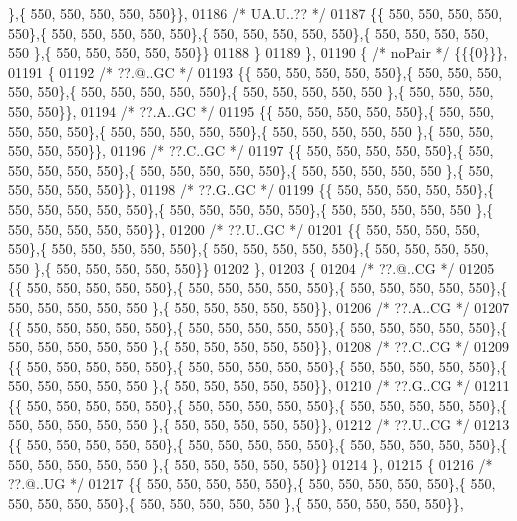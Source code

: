 \begin{DoxyCode}
      \},\{ 550, 550, 550, 550, 550\}\},
01186 \textcolor{comment}{/* UA.U..?? */}
01187 \{\{ 550, 550, 550, 550, 550\},\{ 550, 550, 550, 550, 550\},\{ 550, 550, 550, 550, 550\},\{ 550, 550, 550, 550, 550
      \},\{ 550, 550, 550, 550, 550\}\}
01188 \}
01189 \},
01190 \{ \textcolor{comment}{/* noPair */} \{\{\{0\}\}\},
01191 \{
01192 \textcolor{comment}{/* ??.@..GC */}
01193 \{\{ 550, 550, 550, 550, 550\},\{ 550, 550, 550, 550, 550\},\{ 550, 550, 550, 550, 550\},\{ 550, 550, 550, 550, 550
      \},\{ 550, 550, 550, 550, 550\}\},
01194 \textcolor{comment}{/* ??.A..GC */}
01195 \{\{ 550, 550, 550, 550, 550\},\{ 550, 550, 550, 550, 550\},\{ 550, 550, 550, 550, 550\},\{ 550, 550, 550, 550, 550
      \},\{ 550, 550, 550, 550, 550\}\},
01196 \textcolor{comment}{/* ??.C..GC */}
01197 \{\{ 550, 550, 550, 550, 550\},\{ 550, 550, 550, 550, 550\},\{ 550, 550, 550, 550, 550\},\{ 550, 550, 550, 550, 550
      \},\{ 550, 550, 550, 550, 550\}\},
01198 \textcolor{comment}{/* ??.G..GC */}
01199 \{\{ 550, 550, 550, 550, 550\},\{ 550, 550, 550, 550, 550\},\{ 550, 550, 550, 550, 550\},\{ 550, 550, 550, 550, 550
      \},\{ 550, 550, 550, 550, 550\}\},
01200 \textcolor{comment}{/* ??.U..GC */}
01201 \{\{ 550, 550, 550, 550, 550\},\{ 550, 550, 550, 550, 550\},\{ 550, 550, 550, 550, 550\},\{ 550, 550, 550, 550, 550
      \},\{ 550, 550, 550, 550, 550\}\}
01202 \},
01203 \{
01204 \textcolor{comment}{/* ??.@..CG */}
01205 \{\{ 550, 550, 550, 550, 550\},\{ 550, 550, 550, 550, 550\},\{ 550, 550, 550, 550, 550\},\{ 550, 550, 550, 550, 550
      \},\{ 550, 550, 550, 550, 550\}\},
01206 \textcolor{comment}{/* ??.A..CG */}
01207 \{\{ 550, 550, 550, 550, 550\},\{ 550, 550, 550, 550, 550\},\{ 550, 550, 550, 550, 550\},\{ 550, 550, 550, 550, 550
      \},\{ 550, 550, 550, 550, 550\}\},
01208 \textcolor{comment}{/* ??.C..CG */}
01209 \{\{ 550, 550, 550, 550, 550\},\{ 550, 550, 550, 550, 550\},\{ 550, 550, 550, 550, 550\},\{ 550, 550, 550, 550, 550
      \},\{ 550, 550, 550, 550, 550\}\},
01210 \textcolor{comment}{/* ??.G..CG */}
01211 \{\{ 550, 550, 550, 550, 550\},\{ 550, 550, 550, 550, 550\},\{ 550, 550, 550, 550, 550\},\{ 550, 550, 550, 550, 550
      \},\{ 550, 550, 550, 550, 550\}\},
01212 \textcolor{comment}{/* ??.U..CG */}
01213 \{\{ 550, 550, 550, 550, 550\},\{ 550, 550, 550, 550, 550\},\{ 550, 550, 550, 550, 550\},\{ 550, 550, 550, 550, 550
      \},\{ 550, 550, 550, 550, 550\}\}
01214 \},
01215 \{
01216 \textcolor{comment}{/* ??.@..UG */}
01217 \{\{ 550, 550, 550, 550, 550\},\{ 550, 550, 550, 550, 550\},\{ 550, 550, 550, 550, 550\},\{ 550, 550, 550, 550, 550
      \},\{ 550, 550, 550, 550, 550\}\},

\end{DoxyCode}
